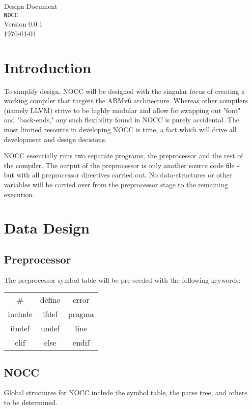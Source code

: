 \documentclass{article}
\newcommand{\NOCCVersion}{0.0.1}
\begin{document}
\begin{center}
\Huge
Design Document\\\vspace{2cm}
\texttt{NOCC}\\\vspace{1cm}
\Large
Version \NOCCVersion\\
\today
\end{center}

\newpage
\section{Introduction}
To simplify design, NOCC will be designed with the singular focus of creating a working compiler that targets the ARMv6 architecture.
Whereas other compilers (namely LLVM) strive to be highly modular and allow for swapping out "font" and "back-ends," any such flexibility found in NOCC is purely accidental.
The most limited resource in developing NOCC is time, a fact which will drive all development and design decisions.

NOCC essentially runs two separate programs, the preprocessor and the rest of the compiler.
The output of the preprocessor is only another source code file - but with all preprocessor directives carried out.
No data-structures or other variables will be carried over from the preprocessor stage to the remaining execution.

\section{Data Design}

\subsection{Preprocessor}
The preprocessor symbol table will be pre-seeded with the following keywords:
\begin{center}
\begin{tabular}{c c c}
\#  &   define & error\\
include &   ifdef & pragma\\
ifndef &   undef & line\\
elif    &   else & endif\\
\end{tabular}
\end{center}

\subsection{NOCC}
Global structures for NOCC include the symbol table, the parse tree, and others to be determined.
\end{document}
